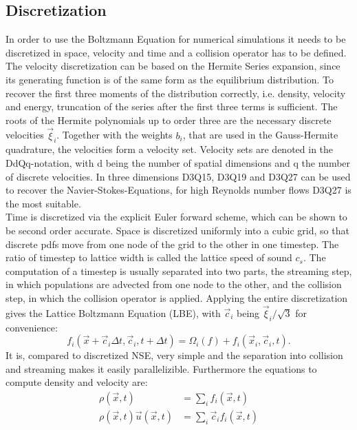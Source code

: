 \subsection{Discretization}
In order to use the Boltzmann Equation for numerical simulations it needs to be discretized in space, velocity and time and a collision operator has to be defined. The velocity discretization can be based on the Hermite Series expansion, since its generating function is of the same form as the equilibrium distribution. To recover the first three moments of the distribution correctly, i.e. density, velocity and energy, truncation of the series after the first three terms is sufficient. The roots of the Hermite polynomials up to order three are the necessary discrete velocities $\vec{\xi}_i$. Together with the weights $b_i$, that are used in the Gauss-Hermite quadrature, the velocities form a velocity set. Velocity sets are denoted in the DdQq-notation, with d being the number of spatial dimensions and q the number of discrete velocities. In three dimensions D3Q15, D3Q19 and D3Q27 can be used to recover the Navier-Stokes-Equations, for high Reynolds number flows D3Q27 is the most suitable\cite{kang_effect_2013}. \cite[p. 73-93]{kruger_lattice_2017} \\
Time is discretized via the explicit Euler forward scheme, which can be shown to be second order accurate. Space is discretized uniformly into a cubic grid, so that discrete pdfs move from one node of the grid to the other in one timestep. The ratio of timestep to lattice width is called the lattice speed of sound $c_s$. The computation of a timestep is usually separated into two parts, the streaming step, in which populations are advected from one node to the other, and the collision step, in which the collision operator is applied. Applying the entire discretization gives the Lattice Boltzmann Equation (LBE), with $\vec{c}_i$ being $\vec{\xi}_i/\sqrt{3}$ for convenience:
\begin{equation}
	f_i(\vec{x} + \vec{c}_i \Delta t, \vec{c}_i, t+\Delta t ) = \Omega_i(f) + f_i(\vec{x}_i, \vec{c}_i, t). \label{eq:LBE}
\end{equation}
 It is, compared to discretized NSE, very simple and the separation into collision and streaming makes it easily parallelizible. Furthermore the equations to compute density and velocity are: \cite[p. 94-98]{kruger_lattice_2017}
\begin{align}
	\rho(\vec{x}, t) &= \sum_i f_i(\vec{x}, t) \label{eq:density_d} \\
	\rho(\vec{x}, t) \vec{u}(\vec{x}, t) &= \sum_i \vec{c}_i f_i(\vec{x}, t) \label{eq:vel_d}
\end{align}
